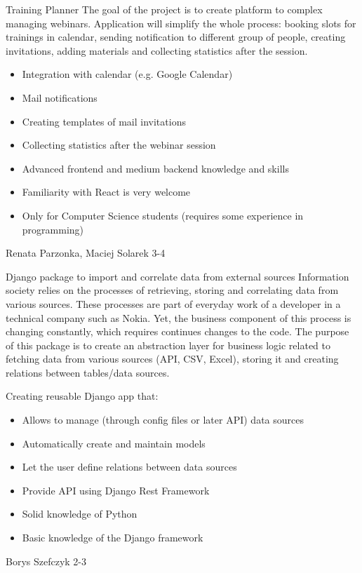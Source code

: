 \begin{project}
{Training Planner}
{The goal of the project is to create platform to complex managing webinars. Application will simplify the whole process: booking slots for trainings in calendar, sending notification to different group of people, creating invitations, adding materials and collecting statistics after the session.}
{
\begin{itemize}
	\item Integration with calendar (e.g. Google Calendar)
	\item Mail notifications
	\item Creating templates of mail invitations
	\item Collecting statistics after the webinar session
\end{itemize}
}
{
\begin{itemize}
	\item Advanced frontend and medium backend knowledge and skills
	\item Familiarity with React is very welcome
	\item Only for Computer Science students (requires some experience in programming)
\end{itemize}
}
{Renata Parzonka, Maciej Solarek}
{3-4}
\end{project}
\begin{project}
{Django package to import and correlate data from external sources}
{Information society relies on the processes of retrieving, storing and correlating data from various sources. These processes are part of everyday work of a developer in a technical company such as Nokia. Yet, the business component of this process is changing constantly, which requires continues changes to the code. The purpose of this package is to create an abstraction layer for business logic related to fetching data from various sources (API, CSV, Excel), storing it and creating relations between tables/data sources.}
{
Creating reusable Django app that:
\begin{itemize}
	\item Allows to manage (through config files or later API) data sources
	\item Automatically create and maintain models
	\item Let the user define relations between data sources
	\item Provide API using Django Rest Framework
\end{itemize}
}
{
\begin{itemize}
	\item Solid knowledge of Python
	\item Basic knowledge of the Django framework
\end{itemize}
}
{Borys Szefczyk}
{2-3}
\end{project}
